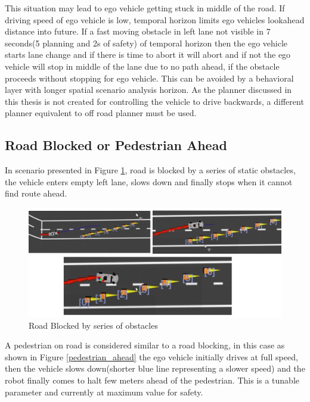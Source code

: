 This situation may lead to ego vehicle getting stuck in middle of the road. If driving speed of ego vehicle is low, temporal horizon limits ego vehicles lookahead distance into future. If a fast moving obstacle in left lane not visible in 7 seconds(5 planning and 2s of safety) of temporal horizon then the ego vehicle starts lane change and if there is time to abort it will abort and if not the ego vehicle will stop in middle of the lane due to no path ahead, if the obstacle proceeds without stopping for ego vehicle. This can be avoided by a behavioral layer with longer spatial scenario analysis horizon. As the planner discussed in this thesis is not created for controlling the vehicle to drive backwards, a different planner equivalent to off road planner must be used.  


\subsection{Road Blocked or Pedestrian Ahead}

In scenario presented in Figure \ref{road_blocked}, road is blocked by a series of static obstacles, the vehicle enters empty left lane, slows down and finally stops when it cannot find route ahead. 

\begin{figure}[h]
    \centering
    \includegraphics[width=1.0\textwidth]{Images/evaluation/road_blocked1.jpg}
    \caption{Road Blocked by series of obstacles}
    \label{road_blocked}
\end{figure}

A pedestrian on road is considered similar to a road blocking, in this case as shown in Figure \ref{pedestrian_ahead} the ego vehicle initially drives at full speed, then the vehicle slows down(shorter blue line representing a slower speed) and the robot finally comes to halt few meters ahead of the pedestrian. This is a tunable parameter and currently at maximum value for safety. 

